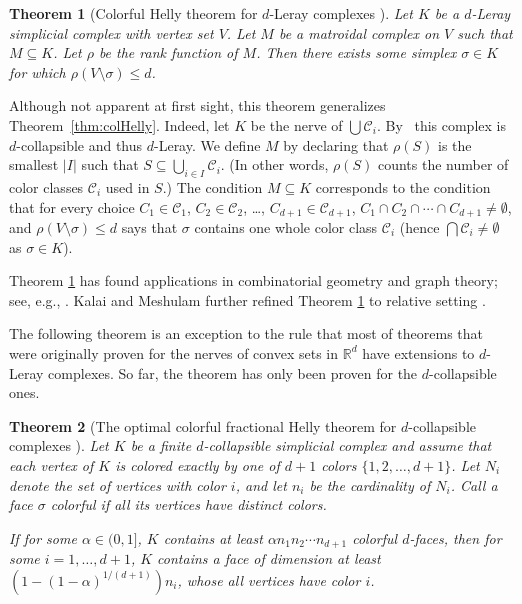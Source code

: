 \documentclass[a4paper,12pt]{amsart}
\newcommand{\R}{\mathbb{R}} 	%
\newtheorem{theorem}{Theorem}
\theoremstyle{definition}
\begin{document}
\begin{theorem}[Colorful Helly theorem for $d$-Leray complexes \cite{lerayCHelly}]\label{thm:colHel}
Let $K$ be a $d$-Leray 
simplicial complex with vertex set $V$. Let $M$ be a matroidal complex on $V$ such that $M\subseteq K$. Let $\rho$ be the rank function of $M$. Then there exists some simplex $\sigma\in K$ for which $\rho(V\setminus \sigma)\leq d$.
\end{theorem}
Although not apparent at first sight, this theorem generalizes Theorem~\ref{thm:colHelly}.
Indeed, let $K$ be the nerve of $\bigcup \mathcal C_i$. By~\cite{wegner75} this complex is $d$-collapsible and thus $d$-Leray.
We define $M$ by declaring that $\rho(S)$ is the smallest $|I|$ such that $S\subseteq \bigcup_{i\in I} \mathcal C_i$. (In other words, $\rho(S)$ counts the number of color classes $\mathcal C_i$ used in $S$.)
The condition $M\subseteq K$ corresponds to the condition that for every choice $C_1\in\mathcal C_1$, $C_2\in\mathcal C_2$, \ldots, $C_{d+1}\in\mathcal C_{d+1}$, $C_1\cap C_2\cap \cdots\cap C_{d+1}\neq \emptyset$, and $\rho(V\setminus \sigma)\leq d$ says that $\sigma$ contains one whole color class $\mathcal C_i$ (hence $\bigcap \mathcal C_i \neq \emptyset$ as $\sigma \in K$).

Theorem \ref{thm:colHel} has found applications in combinatorial geometry and graph theory; see, e.g., \cite{cliques_in_hypergraphs, HolmKar_colorStrongConv, AharoniHolzmanJiang, KimLew}. Kalai and Meshulam further refined Theorem \ref{thm:colHel} to relative setting \cite{KalMesh}.
\bigskip

The following theorem is an exception to the rule that most of theorems that were originally proven for the nerves of convex sets in $\R^d$ have extensions to $d$-Leray complexes. 
So far, the theorem has only been proven for the $d$-collapsible ones.
\begin{theorem}[The optimal colorful fractional Helly theorem for $d$-collapsible complexes \cite{optimalCFHelly}]
Let $K$ be a finite $d$-collapsible simplicial complex and assume that each vertex of $K$ is colored exactly by one of $d+1$ colors $\{1,2,\ldots, d+1\}$. 
Let $N_i$ denote the set of vertices with color $i$,
and let $n_i$ be the cardinality of $N_i$.
Call a face $\sigma$ colorful if all its vertices have distinct colors.

If for some $\alpha\in(0,1]$, $K$ contains at least $\alpha n_1n_2\cdots n_{d+1}$ colorful $d$-faces, then for some $i=1,\ldots, d+1$, $K$ contains a face of dimension at least $\left(1-(1-\alpha)^{1/(d+1)}\right)n_i$, whose all vertices have color $i$.
\end{theorem}
\end{document}
